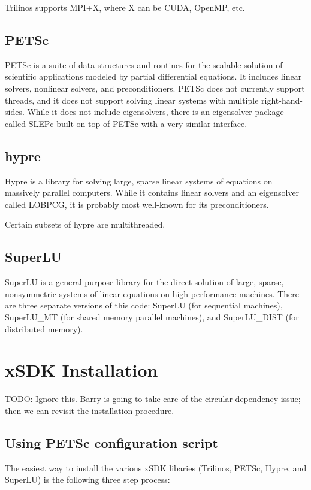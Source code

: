 \documentclass[pdf,12pt,report,strict]{SANDreport}
\begin{document}
Trilinos supports MPI+X, where X can be CUDA, OpenMP, etc.

\section{PETSc}
PETSc is a suite of data structures and routines for the scalable solution of
scientific applications modeled by partial differential equations.
It includes linear solvers, nonlinear solvers, and preconditioners.  PETSc does
not currently support threads, and it does not support solving linear systems
with multiple right-hand-sides.  While it does not include eigensolvers, there
is an eigensolver package called SLEPc built on top of PETSc with a very similar
interface.

\section{hypre}
Hypre is a library for solving large, sparse linear systems of equations on
massively parallel computers.  While it contains linear solvers and an
eigensolver called LOBPCG, it is probably most well-known for its
preconditioners.

Certain subsets of hypre are multithreaded.

\section{SuperLU}
SuperLU is a general purpose library for the direct solution of large, sparse,
nonsymmetric systems of linear equations on high performance machines. There are
three separate versions of this code: SuperLU (for sequential machines),
SuperLU\_MT (for shared memory parallel machines), and SuperLU\_DIST (for
distributed memory).

\SANDmain

\chapter{xSDK Installation}
{\color{red}TODO: Ignore this.  Barry is going to take care of the circular
dependency issue; then we can revisit the installation procedure.}

\section{Using PETSc configuration script}
The easiest way to install the various xSDK libaries (Trilinos, PETSc, Hypre,
and SuperLU) is the following three step process:
\end{document}
